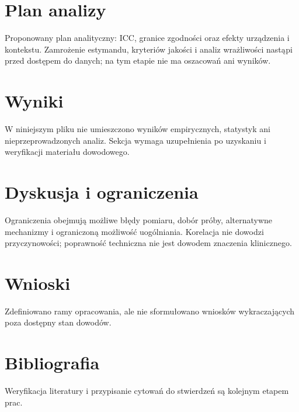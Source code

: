 \documentclass[11pt,a4paper]{article}
\begin{document}
\section{Plan analizy}

Proponowany plan analityczny: ICC, granice zgodności oraz efekty urządzenia i kontekstu. Zamrożenie estymandu, kryteriów jakości i analiz wrażliwości nastąpi przed dostępem do danych; na tym etapie nie ma oszacowań ani wyników.

\section{Wyniki}

W niniejszym pliku nie umieszczono wyników empirycznych, statystyk ani nieprzeprowadzonych analiz. Sekcja wymaga uzupełnienia po uzyskaniu i weryfikacji materiału dowodowego.

\section{Dyskusja i ograniczenia}

Ograniczenia obejmują możliwe błędy pomiaru, dobór próby, alternatywne mechanizmy i ograniczoną możliwość uogólniania. Korelacja nie dowodzi przyczynowości; poprawność techniczna nie jest dowodem znaczenia klinicznego.

\section{Wnioski}

Zdefiniowano ramy opracowania, ale nie sformułowano wniosków wykraczających poza dostępny stan dowodów.

\section*{Bibliografia}

Weryfikacja literatury i przypisanie cytowań do stwierdzeń są kolejnym etapem prac.
\end{document}
